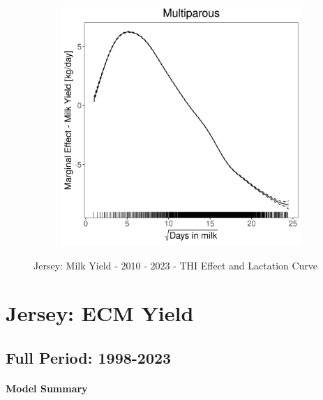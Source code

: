 \begin{figure}[H]
\begin{subfigure}[b]{0.45\textwidth}
    \end{subfigure}
    \hspace{0.05\textwidth} %
    \begin{subfigure}[b]{0.45\textwidth}
        \centering
        \includegraphics[width=\textwidth]{thesis/figures/models/milk/after2010/je_milk_after2010/je_milk_after2010_marginal_dim_milk_multi.png}
    \end{subfigure}
    \caption[]{Jersey: Milk Yield - 2010 - 2023 - THI Effect and Lactation Curve}
    \label{fig:main}
\end{figure}

\section{Jersey: ECM Yield}
\subsection{Full Period: 1998-2023}\label{model:je_ecm_full}
\paragraph{Model Summary} \quad \\

